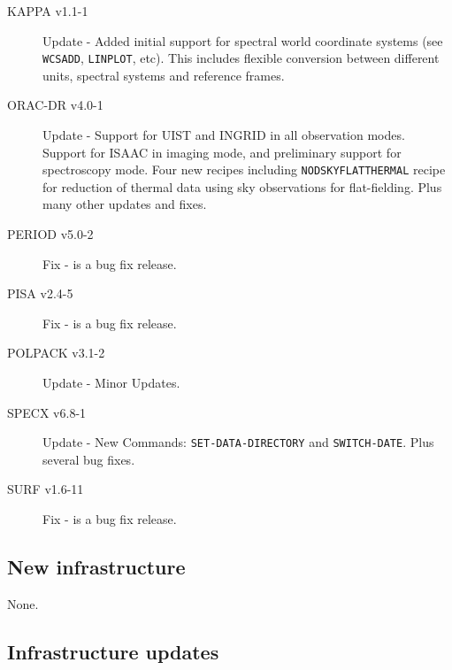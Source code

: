 \documentclass[twoside,11pt]{article}
\newcommand{\xlabel}[1]{}
\renewcommand{\_}{\texttt{\symbol{95}}}
\begin{document}
\begin{description}
\item[KAPPA v1.1-1]  Update - Added initial support for spectral world coordinate systems
(see \texttt{WCSADD}, \texttt{LINPLOT}, etc). This includes flexible conversion between different
units, spectral systems and reference frames.

\item[ORAC-DR v4.0-1] Update - Support for UIST and INGRID in all observation modes.
Support for ISAAC in imaging mode, and preliminary support for spectroscopy mode.
Four new recipes including \texttt{NOD\_SKY\_FLAT\_THERMAL} recipe for reduction of thermal data
using sky observations for flat-fielding. Plus many other updates and fixes.

\item[PERIOD v5.0-2] Fix - is a bug fix release.

\item[PISA v2.4-5] Fix - is a bug fix release.

\item[POLPACK v3.1-2] Update - Minor Updates.

\item[SPECX v6.8-1] Update - New Commands: \texttt{SET-DATA-DIRECTORY} and \texttt{SWITCH-DATE}.
Plus several bug fixes.

\item[SURF v1.6-11] Fix - is a bug fix release.

\end{description}

\subsection{\xlabel{new_infrastructure}New infrastructure}
\label{new_infrastructure}

None.





\subsection{\xlabel{infrastructure_updates}Infrastructure updates}
\label{infrastructure_updates}
\end{document}

